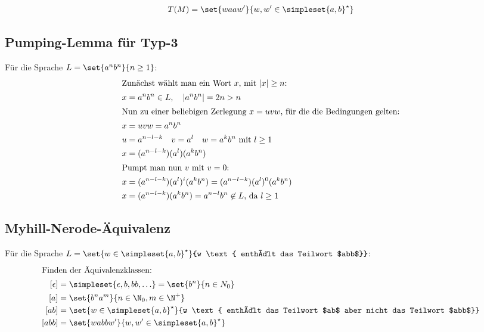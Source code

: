 \begin{itemize}

	\begin{equation*}
		T(M)=\set{waaw'}{w,w'\in\simpleset{a,b}^\star}
	\end{equation*}
\end{itemize}

\subsection{Pumping-Lemma für Typ-3}\label{bsp:pumpingLemma}
Für die Sprache $L=\set{a^nb^n}{n\geq 1}$:%
\begin{align*}
	\intertext{Zunächst wählt man ein Wort $x$, mit $|x|\geq n$:}
	x&=a^nb^n \in L,\quad |a^nb^n|=2n>n\\
	\intertext{Nun zu einer beliebigen Zerlegung $x=uvw$, für die die Bedingungen gelten:}
	x&=uvw=a^nb^n\\
	u&=a^{n-l-k} \quad v=a^l \quad w=a^k b^n \text{ mit $l\geq 1$}\\
	x&=(a^{n-l-k}) (a^l) (a^k b^n)\\
	\intertext{Pumpt man nun $v$ mit $v=0$:}
	x&=(a^{n-l-k}) (a^l)^i (a^k b^n)=(a^{n-l-k}) (a^l)^0 (a^k b^n)\\
	x&=(a^{n-l-k}) (a^k b^n) = a^{n-l} b^n \not\in L\text{, da $l\geq 1$}\\
\end{align*}


\subsection{Myhill-Nerode-Äquivalenz}\label{bsp:myhill}
Für die Sprache $L=\set{w\in\simpleset{a,b}^\star}{w \text{ enthält das Teilwort $abb$}}$:%
\begin{align*}
	\intertext{Finden der Äquivalenzklassen:}
	[\epsilon]&=\simpleset{\epsilon, b, bb, \ldots}=\set{b^n}{n\in N_0}\\
	[a]&=\set{b^na^m}{n\in\N_0, m\in\N^+}\\
	[ab]&=\set{w\in\simpleset{a,b}^\star}{w \text{ enthält das Teilwort $ab$ aber nicht das Teilwort $abb$}}\\
	[abb]&=\set{wabbw'}{w,w'\in\simpleset{a,b}^\star}
\end{align*}


